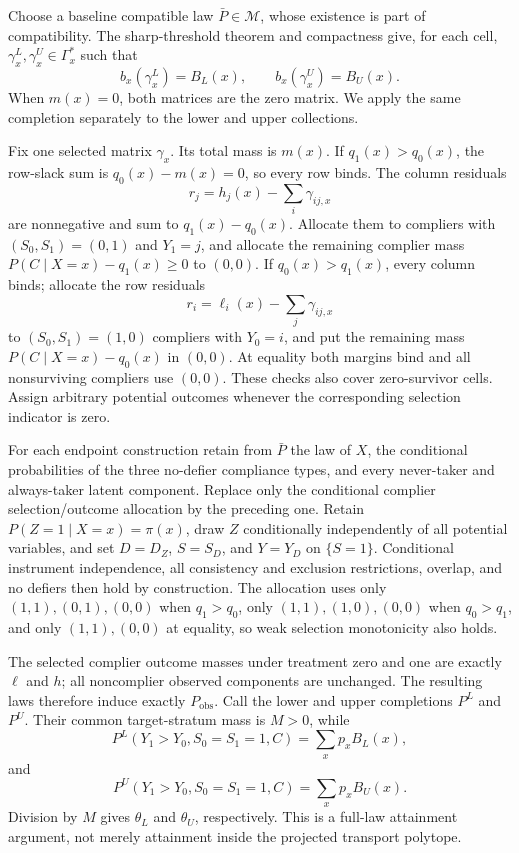 Choose a baseline compatible law \(\bar P\in\mathcal M\), whose existence is part of compatibility.  The sharp-threshold theorem and compactness give, for each cell, \(\gamma_x^L,\gamma_x^U\in\Gamma_x^{\ast}\) such that
\[
b_x(\gamma_x^L)=B_L(x),\qquad b_x(\gamma_x^U)=B_U(x).
\]
When \(m(x)=0\), both matrices are the zero matrix.  We apply the same completion separately to the lower and upper collections.

Fix one selected matrix \(\gamma_x\).  Its total mass is \(m(x)\).  If \(q_1(x)>q_0(x)\), the row-slack sum is \(q_0(x)-m(x)=0\), so every row binds.  The column residuals
\[
r_j=h_j(x)-\sum_i\gamma_{ij,x}
\]
are nonnegative and sum to \(q_1(x)-q_0(x)\).  Allocate them to compliers with \((S_0,S_1)=(0,1)\) and \(Y_1=j\), and allocate the remaining complier mass \(P(C\mid X=x)-q_1(x)\ge0\) to \((0,0)\).  If \(q_0(x)>q_1(x)\), every column binds; allocate the row residuals
\[
r_i=\ell_i(x)-\sum_j\gamma_{ij,x}
\]
to \((S_0,S_1)=(1,0)\) compliers with \(Y_0=i\), and put the remaining mass \(P(C\mid X=x)-q_0(x)\) in \((0,0)\).  At equality both margins bind and all nonsurviving compliers use \((0,0)\).  These checks also cover zero-survivor cells.  Assign arbitrary potential outcomes whenever the corresponding selection indicator is zero.

For each endpoint construction retain from \(\bar P\) the law of \(X\), the conditional probabilities of the three no-defier compliance types, and every never-taker and always-taker latent component.  Replace only the conditional complier selection/outcome allocation by the preceding one.  Retain \(P(Z=1\mid X=x)=\pi(x)\), draw \(Z\) conditionally independently of all potential variables, and set \(D=D_Z\), \(S=S_D\), and \(Y=Y_D\) on \(\{S=1\}\).  Conditional instrument independence, all consistency and exclusion restrictions, overlap, and no defiers then hold by construction.  The allocation uses only \((1,1),(0,1),(0,0)\) when \(q_1>q_0\), only \((1,1),(1,0),(0,0)\) when \(q_0>q_1\), and only \((1,1),(0,0)\) at equality, so weak selection monotonicity also holds.

The selected complier outcome masses under treatment zero and one are exactly \(\ell\) and \(h\); all noncomplier observed components are unchanged.  The resulting laws therefore induce exactly \(P_{\mathrm{obs}}\).  Call the lower and upper completions \(P^L\) and \(P^U\).  Their common target-stratum mass is \(M>0\), while
\[
P^L(Y_1>Y_0,S_0=S_1=1,C)=\sum_xp_xB_L(x),
\]
and
\[
P^U(Y_1>Y_0,S_0=S_1=1,C)=\sum_xp_xB_U(x).
\]
Division by \(M\) gives \(\theta_L\) and \(\theta_U\), respectively.  This is a full-law attainment argument, not merely attainment inside the projected transport polytope.